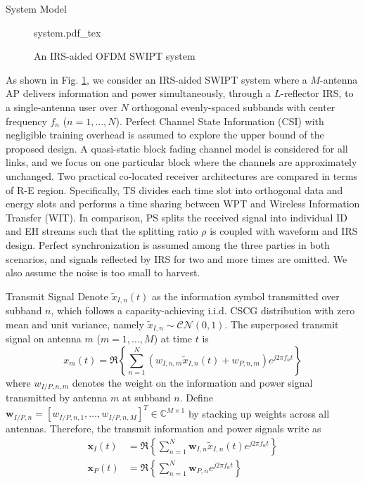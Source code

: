 \documentclass[journal]{IEEEtran}
\begin{document}
	\begin{section}{System Model}\label{se:system_model}
		\begin{figure}[!t]
			\centering
			\def\svgwidth{\columnwidth}
			{system.pdf_tex}
			\caption{An IRS-aided OFDM SWIPT system}
			\label{fi:system}
		\end{figure}

		As shown in Fig. \ref{fi:system}, we consider an IRS-aided SWIPT system where a $M$-antenna AP delivers information and power simultaneously, through a $L$-reflector IRS, to a single-antenna user over $N$ orthogonal evenly-spaced subbands with center frequency $f_n$ ($n=1,\dots,N$). Perfect Channel State Information (CSI) with negligible training overhead is assumed to explore the upper bound of the proposed design. A quasi-static block fading channel model is considered for all links, and we focus on one particular block where the channels are approximately unchanged. Two practical co-located receiver architectures are compared in terms of R-E region. Specifically, TS divides each time slot into orthogonal data and energy slots and performs a time sharing between WPT and Wireless Information Transfer (WIT). In comparison, PS splits the received signal into individual ID and EH streams such that the splitting ratio $\rho$ is coupled with waveform and IRS design. Perfect synchronization is assumed among the three parties in both scenarios, and signals reflected by IRS for two and more times are omitted. We also assume the noise is too small to harvest.


		\begin{subsection}{Transmit Signal}
			Denote $\tilde{x}_{I,n}(t)$ as the information symbol transmitted over subband $n$, which follows a capacity-achieving i.i.d. CSCG distribution with zero mean and unit variance, namely $\tilde{x}_{I,n}\sim\mathcal{CN}(0,1)$. The superposed transmit signal on antenna $m$ ($m=1,\dots,M$) at time $t$ is
			\begin{equation}\label{eq:x_m}
				x_m(t)=\Re\left\{\sum_{n=1}^N\left({w_{I,n,m}\tilde{x}_{I,n}(t)}+w_{P,n,m}\right){e^{j2{\pi}{f_n}{t}}}\right\}
			\end{equation}
			where $w_{I/P,n,m}$ denotes the weight on the information and power signal transmitted by antenna $m$ at subband $n$. Define $\boldsymbol{w}_{I/P,n}=[w_{I/P,n,1},\dots,w_{I/P,n,M}]^T \in \mathbb{C}^{M \times 1}$ by stacking up weights across all antennas. Therefore, the transmit information and power signals write as
			\begin{align}
				\boldsymbol{x}_{I}(t) &= \Re{\left\{\sum_{n=1}^N\boldsymbol{w}_{I,n}\tilde{x}_{I,n}(t){e^{j2{\pi}{f_n}{t}}}\right\}}\label{eq:x_I}\\
				\boldsymbol{x}_{P}(t) &= \Re{\left\{\sum_{n=1}^N\boldsymbol{w}_{P,n}{e^{j2{\pi}{f_n}{t}}}\right\}}\label{eq:x_P}
			\end{align}
		\end{subsection}



\end{section}
\end{document}
